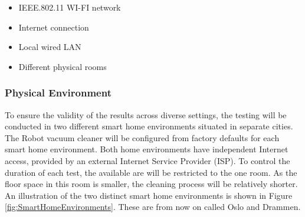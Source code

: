 \begin{itemize}
    \item IEEE.802.11 WI-FI network
    \item Internet connection
    \item Local wired LAN
    \item Different physical rooms
\end{itemize}

\subsubsection{Physical Environment}
To ensure the validity of the results across diverse settings, the testing will be conducted in two different smart home environments situated in separate cities. The Robot vacuum cleaner will be configured from factory defaults for each smart home environment. Both home environments have independent Internet access, provided by an external Internet Service Provider (ISP). To control the duration of each test, the available are will be restricted to the one room. As the floor space in this room is smaller, the cleaning process will be relatively shorter. An illustration of the two distinct smart home environments is shown in Figure \ref{fig:SmartHomeEnvironments}. These are from now on called Oslo and Drammen.

